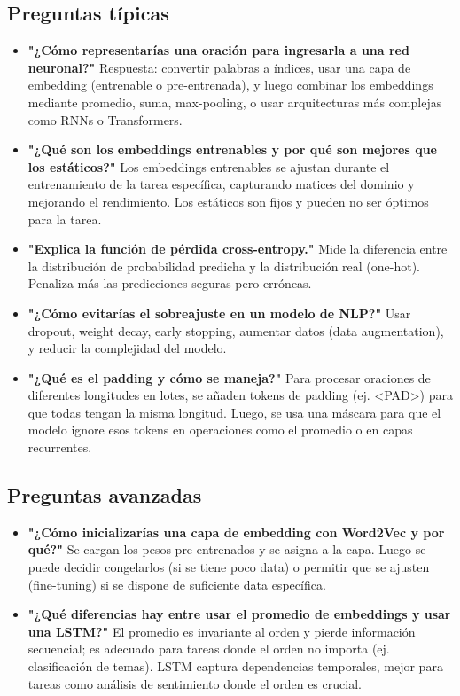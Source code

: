 \documentclass[12pt,a4paper,openany,oneside]{book}
\begin{document}
\subsection{Preguntas típicas}
\begin{itemize}
    \item \textbf{"¿Cómo representarías una oración para ingresarla a una red neuronal?"}
    Respuesta: convertir palabras a índices, usar una capa de embedding (entrenable o pre-entrenada), y luego combinar los embeddings mediante promedio, suma, max-pooling, o usar arquitecturas más complejas como RNNs o Transformers.
    
    \item \textbf{"¿Qué son los embeddings entrenables y por qué son mejores que los estáticos?"}
    Los embeddings entrenables se ajustan durante el entrenamiento de la tarea específica, capturando matices del dominio y mejorando el rendimiento. Los estáticos son fijos y pueden no ser óptimos para la tarea.
    
    \item \textbf{"Explica la función de pérdida cross-entropy."}
    Mide la diferencia entre la distribución de probabilidad predicha y la distribución real (one-hot). Penaliza más las predicciones seguras pero erróneas.
    
    \item \textbf{"¿Cómo evitarías el sobreajuste en un modelo de NLP?"}
    Usar dropout, weight decay, early stopping, aumentar datos (data augmentation), y reducir la complejidad del modelo.
    
    \item \textbf{"¿Qué es el padding y cómo se maneja?"}
    Para procesar oraciones de diferentes longitudes en lotes, se añaden tokens de padding (ej. <PAD>) para que todas tengan la misma longitud. Luego, se usa una máscara para que el modelo ignore esos tokens en operaciones como el promedio o en capas recurrentes.
\end{itemize}

\subsection{Preguntas avanzadas}
\begin{itemize}
    \item \textbf{"¿Cómo inicializarías una capa de embedding con Word2Vec y por qué?"}
    Se cargan los pesos pre-entrenados y se asigna a la capa. Luego se puede decidir congelarlos (si se tiene poco data) o permitir que se ajusten (fine-tuning) si se dispone de suficiente data específica.
    
    \item \textbf{"¿Qué diferencias hay entre usar el promedio de embeddings y usar una LSTM?"}
    El promedio es invariante al orden y pierde información secuencial; es adecuado para tareas donde el orden no importa (ej. clasificación de temas). LSTM captura dependencias temporales, mejor para tareas como análisis de sentimiento donde el orden es crucial.
\end{itemize}
\end{document}
